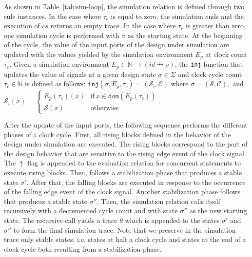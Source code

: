 \documentclass[pdflatex,sn-mathphys]{sn-jnl}%
\theoremstyle{thmstyleone}%
\theoremstyle{thmstyletwo}%
\theoremstyle{thmstylethree}%
\begin{document}
As shown in Table~\ref{tab:sim-loop}, the \hvhdl{} simulation relation
is defined through two rule instances.  In the case where $\tau_c$ is
equal to zero, the simulation ends and the execution of $cs$ returns
an empty trace. In the case where $\tau_c$ is greater than zero, one
simulation cycle is performed with $\sigma$ as the starting state. At
the beginning of the cycle, the value of the input ports of the design
under simulation are updated with the values yielded by the simulation
environment $E_p$ at clock count $\tau_c$. Given a simulation
environment $E_p\in\mathbb{N}\rightarrow(id\nrightarrow{}v)$, the
\texttt{inj} function that updates the value of signals at a given
design state $\sigma\in\Sigma$ and clock cycle count
$\tau_c\in{}\mathbb{N}$ is defined as follows:
$\mathtt{inj}(\sigma,E_p,\tau_c)=(\mathcal{S}_i,\mathcal{C})$ where
$\sigma=(\mathcal{S},\mathcal{C}), $ and $\mathcal{S}_i(x)=
\begin{cases}
  E_p(\tau_c)(x) & \mathrm{if}~x\in\mathtt{dom}(E_p(\tau_c)) \\
  \mathcal{S}(x) & \mathrm{otherwise}
\end{cases}$.

After the update of the input ports, the following sequence performs
the different phases of a clock cycle. First, all rising blocks
defined in the behavior of the design under simulation are
executed. The rising blocks correspond to the part of the design
behavior that are sensitive to the rising edge event of the clock
signal. %
The $\uparrow$ flag is appended to the evaluation relation for
concurrent statements to execute rising blocks. Then, follows a
stabilization phase that produces a stable state $\sigma'$. After
that, the falling blocks are executed in response to the occurrence of
the falling edge event of the clock signal. Another stabilization
phase follows that produces a stable state $\sigma''$.  Then, the
\hvhdl{} simulation relation calls itself recursively with a
decremented cycle count and with state $\sigma''$ as the new starting
state. The recursive call yields a trace $\theta$ which is appended to
the states $\sigma'$ and $\sigma''$ to form the final simulation
trace. Note that we preserve in the simulation trace only stable
states, i.e. states at half a clock cycle and states at the end of a
clock cycle both resulting from a stabilization phase.
\end{document}

